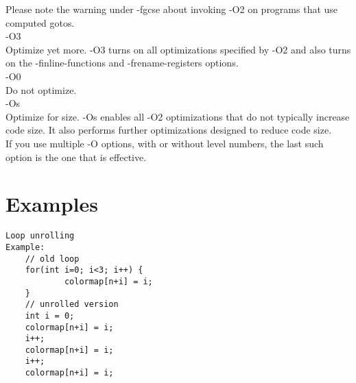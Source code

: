 \documentclass{sem5}
\begin{document}
Please note the warning under -fgcse about invoking -O2 on programs that use computed gotos. \\

-O3\\
Optimize yet more. -O3 turns on all optimizations specified by -O2 and also turns on the -finline-functions and -frename-registers options. \\
-O0\\
Do not optimize. \\
-Os\\
Optimize for size. -Os enables all -O2 optimizations that do not typically increase code size. It also performs further optimizations designed to reduce code size.\\
If you use multiple -O options, with or without level numbers, the last such option is the one that is effective.\\
\section*{Examples}
\begin{lstlisting}
Loop unrolling
Example:
	// old loop 
	for(int i=0; i<3; i++) {
			colormap[n+i] = i;
	}
	// unrolled version
	int i = 0;
	colormap[n+i] = i;
	i++;
	colormap[n+i] = i;
	i++;
	colormap[n+i] = i;
\end{lstlisting}	
	 
\end{document}
